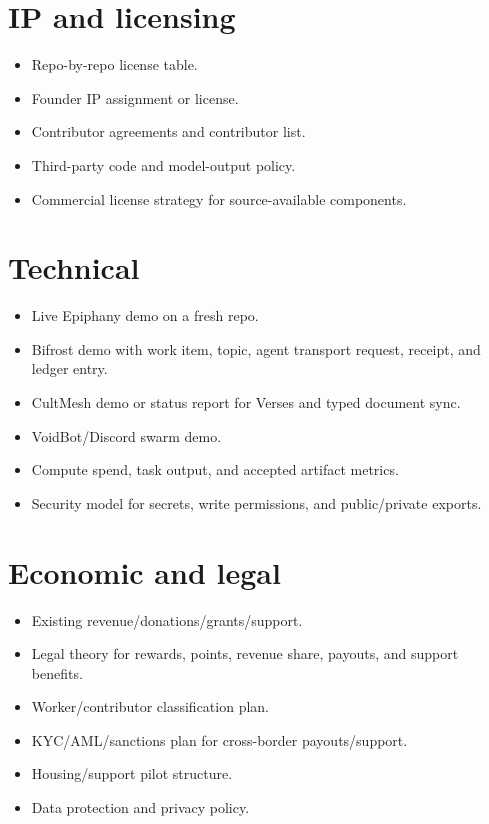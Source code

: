 \documentclass[11pt,oneside]{report}
\begin{document}
\section{IP and licensing}

\begin{itemize}
  \item Repo-by-repo license table.
  \item Founder IP assignment or license.
  \item Contributor agreements and contributor list.
  \item Third-party code and model-output policy.
  \item Commercial license strategy for source-available components.
\end{itemize}

\section{Technical}

\begin{itemize}
  \item Live Epiphany demo on a fresh repo.
  \item Bifrost demo with work item, topic, agent transport request, receipt, and ledger entry.
  \item CultMesh demo or status report for Verses and typed document sync.
  \item VoidBot/Discord swarm demo.
  \item Compute spend, task output, and accepted artifact metrics.
  \item Security model for secrets, write permissions, and public/private exports.
\end{itemize}

\section{Economic and legal}

\begin{itemize}
  \item Existing revenue/donations/grants/support.
  \item Legal theory for rewards, points, revenue share, payouts, and support benefits.
  \item Worker/contributor classification plan.
  \item KYC/AML/sanctions plan for cross-border payouts/support.
  \item Housing/support pilot structure.
  \item Data protection and privacy policy.
\end{itemize}
\end{document}
